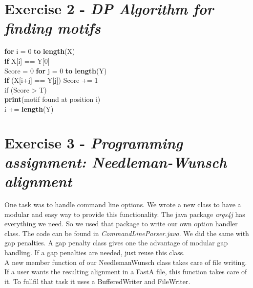 \documentclass[%
   10pt,              %
   ngerman,           %
   a4paper,           %
   DIV11,             %
]{scrartcl}%
\begin{document}
  \section*{Exercise 2 - \textsl{DP Algorithm for finding motifs}}
  \textbf{for} i = 0 \textbf{to} \textbf{length}(X)\\
  \indent \textbf{if} X[i] == Y[0]\\
  \indent \indent Score = 0
  \indent \indent \textbf{for} j = 0 \textbf{to} \textbf{length}(Y)\\
  \indent \indent \indent \textbf{if} (X[i+j] == Y[j]) Score += 1\\
  \indent \indent if (Score > T)\\
  \indent \indent \indent \textbf{print}(motif found at position i)\\
  \indent \indent \indent i += \textbf{length}(Y)
 
  \section*{Exercise 3 - \textsl{Programming assignment: Needleman-Wunsch alignment}}
  One task was to handle command line options. We wrote a new class to have a modular 
  and easy way to provide this functionality. The java package \textit{args4j} has everything
  we need. So we used that package to write our own option handler class. The code can 
  be found in \textit{CommandLineParser.java}. We did the same with gap penalties. A
  gap penalty class gives one the advantage of modular gap handling. If a gap penalties are
  needed, just reuse this class.\\
  A new member function of our NeedlemanWunsch class takes care of file writing. If a user 
  wants the resulting alignment in a FastA file, this function takes care of it. To fullfil 
  that task it uses a BufferedWriter and FileWriter. 
\end{document}
